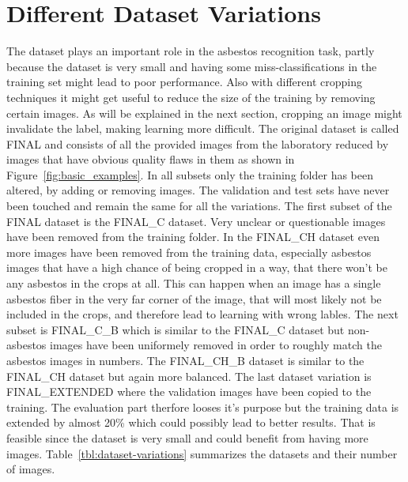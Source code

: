 \section{Different Dataset Variations}

The dataset plays an important role in the asbestos recognition task, partly because the dataset is very small and having some miss-classifications in the training set might lead to poor performance. Also with different cropping techniques it might get useful to reduce the size of the training by removing certain images. As will be explained in the next section, cropping an image might invalidate the label, making learning more difficult. The original dataset is called FINAL and consists of all the provided images from the laboratory reduced by images that have obvious quality flaws in them as shown in Figure~\ref{fig:basic_examples}. In all subsets only the training folder has been altered, by adding or removing images. The validation and test sets have never been touched and remain the same for all the variations. The first subset of the FINAL dataset is the FINAL\_C dataset. Very unclear or questionable images have been removed from the training folder. In the FINAL\_CH dataset even more images have been removed from the training data, especially asbestos images that have a high chance of being cropped in a way, that there won't be any asbestos in the crops at all. This can happen when an image has a single asbestos fiber in the very far corner of the image, that will most likely not be included in the crops, and therefore lead to learning with wrong lables. The next subset is FINAL\_C\_B which is similar to the FINAL\_C dataset but non-asbestos images have been uniformely removed in order to roughly match the asbestos images in numbers. The FINAL\_CH\_B dataset is similar to the FINAL\_CH dataset but again more balanced. The last dataset variation is FINAL\_EXTENDED where the validation images have been copied to the training. The evaluation part therfore looses it's purpose but the training data is extended by almost 20\% which could possibly lead to better results. That is feasible since the dataset is very small and could benefit from having more images. Table~\ref{tbl:dataset-variations} summarizes the datasets and their number of images.

